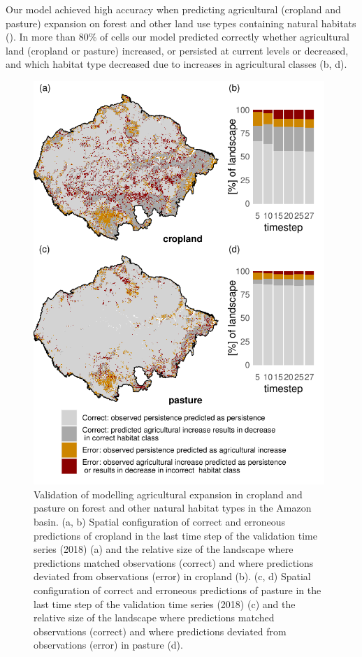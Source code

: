 \documentclass[titlesmallcaps,copyrightpage]{uomthesis}\usepackage[]{graphicx}\usepackage[]{color}
\begin{document}
Our model achieved high accuracy when predicting agricultural (cropland
and pasture) expansion on forest and other land use types containing
natural habitats (). In more than 80\% of cells
our model predicted correctly whether agricultural land (cropland or
pasture) increased, or persisted at current levels or decreased, and
which habitat type decreased due to increases in agricultural classes
(b, d).

\begin{figure}[htb]
\centering 
\includegraphics[width=4.33in]{chapters/figures/chapter3/fig4.pdf}
\caption{Validation of modelling agricultural expansion in cropland and pasture on forest and other natural habitat types in the Amazon basin. (a, b) Spatial configuration of correct and erroneous predictions of cropland in the last time step of the validation time series (2018) (a) and the relative size of the landscape where predictions matched observations (correct) and where predictions deviated from observations (error) in cropland (b). (c, d) Spatial configuration of correct and erroneous predictions of pasture in the last time step of the validation time series (2018) (c) and the relative size of the landscape where predictions matched observations (correct) and where predictions deviated from observations (error) in pasture (d).}
\label{ch3:fig4}
\end{figure}
\end{document}
